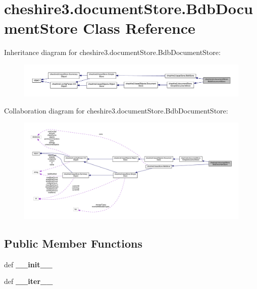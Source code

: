 \hypertarget{classcheshire3_1_1document_store_1_1_bdb_document_store}{\section{cheshire3.\-document\-Store.\-Bdb\-Document\-Store Class Reference}
\label{classcheshire3_1_1document_store_1_1_bdb_document_store}
}


Inheritance diagram for cheshire3.\-document\-Store.\-Bdb\-Document\-Store\-:
\nopagebreak
\begin{figure}[H]
\begin{center}
\leavevmode
\includegraphics[width=350pt]{classcheshire3_1_1document_store_1_1_bdb_document_store__inherit__graph}
\end{center}
\end{figure}


Collaboration diagram for cheshire3.\-document\-Store.\-Bdb\-Document\-Store\-:
\nopagebreak
\begin{figure}[H]
\begin{center}
\leavevmode
\includegraphics[width=350pt]{classcheshire3_1_1document_store_1_1_bdb_document_store__coll__graph}
\end{center}
\end{figure}
\subsection*{Public Member Functions}
\begin{DoxyCompactItemize}
\item 
\hypertarget{classcheshire3_1_1document_store_1_1_bdb_document_store_a625d12f03224270ea28e915464e4ef7b}{def {\bfseries \-\_\-\-\_\-init\-\_\-\-\_\-}}\label{classcheshire3_1_1document_store_1_1_bdb_document_store_a625d12f03224270ea28e915464e4ef7b}

\item 
\hypertarget{classcheshire3_1_1document_store_1_1_bdb_document_store_af0e81372012bde85a1ff085f46b47c2d}{def {\bfseries \-\_\-\-\_\-iter\-\_\-\-\_\-}}\label{classcheshire3_1_1document_store_1_1_bdb_document_store_af0e81372012bde85a1ff085f46b47c2d}

\end{DoxyCompactItemize}
